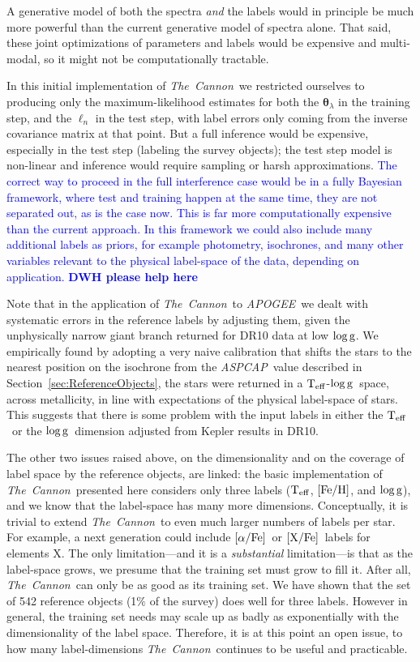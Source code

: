 \documentclass[12pt, preprint]{aastex}
\newcommand{\sectionname}{Section}
\newcommand{\tc}{\textsl{The~Cannon}}
\newcommand{\apogee}{\textsl{APOGEE}}
\newcommand{\aspcap}{\textsl{ASPCAP}}
\newcommand{\set}[1]{\bm{#1}}
\newcommand{\starlabel}{\ell}
\newcommand{\starlabelvec}{\set{\starlabel}}
\newcommand{\teff}{\mbox{$\rm T_{eff}$}}
\newcommand{\feh}{\mbox{$\rm [Fe/H]$}}
\newcommand{\xfe}{\mbox{$\rm [X/Fe]$}}
\newcommand{\alphafe}{\mbox{$\rm [\alpha/Fe]$}}
\newcommand{\logg}{\mbox{$\rm \log g$}}
\begin{document}
A generative model of both the spectra \emph{and} the labels
would in principle be much more powerful than the current generative
model of spectra alone.
That said, these joint optimizations of parameters and labels would be
expensive and multi-modal, so it might not be computationally
tractable.

In this initial implementation of \tc\ we restricted ourselves to producing only the maximum-likelihood estimates for both the $\set{\theta}_\lambda$ in the training step, and the $\starlabelvec_n$
in the test step, with label errors only coming from the inverse covariance matrix at that point.
But a full inference would be expensive, especially in the test step
(labeling the survey objects); the test step model is non-linear and
inference would require sampling or harsh approximations.
 \textcolor{blue}{The correct way to proceed in the full interference case would be in a fully Bayesian framework, where test and training happen at the same time, they are not separated out, as is the case now. 
This is far more computationally expensive than the current approach. In this framework we could also include many additional labels as priors, for example photometry, isochrones, and many other variables relevant to the physical label-space of the data, depending on application.  \textbf{DWH please help here}}


Note that in the application of \tc\ to \apogee\ we dealt with systematic errors in the reference
labels by adjusting them,  given the unphysically narrow giant branch returned for DR10 data at low \logg.  We empirically found by adopting a very naive calibration that shifts the stars to the nearest position on the isochrone from the \aspcap\ value described in \sectionname~\ref{sec:ReferenceObjects}, the stars were returned in a \teff-\logg\ space, across metallicity, in line with expectations of the physical label-space of stars. This suggests that there is some problem with the input labels in either the \teff\ or the \logg\ dimension adjusted from Kepler results in DR10. 

The other two issues raised above, on the dimensionality and on the coverage of label space by the reference objects, are linked: 
the basic implementation of \tc\ presented here considers only three
labels (\teff, \feh, and \logg), and we know that the label-space has many more dimensions.
Conceptually, it is trivial to extend \tc\ to even much larger numbers of labels per star. 
For example, a next generation could include \alphafe\ or \xfe\
labels for elements X.
The only limitation---and it is a \emph{substantial} limitation---is
that as the label-space grows, we presume that the training set must grow to fill it.
After all, \tc\ can only be as good as its training set.
We have shown that the set of 542 reference objects (1$\%$ of the survey) does well for three labels. However in general, the training set needs may scale up as badly as exponentially
with the dimensionality of the label space. Therefore, it is at this point an open issue, to 
how many label-dimensions \tc\ continues to be useful and practicable. 
\end{document}
